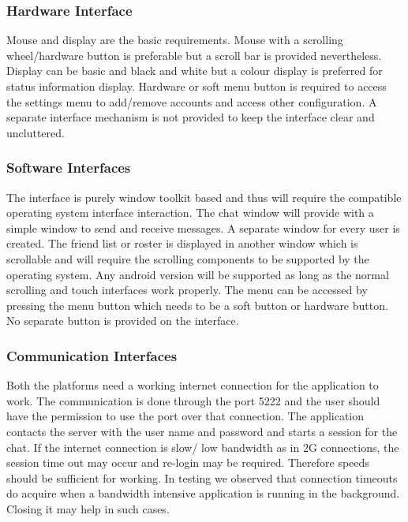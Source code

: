 \documentclass{SureshLimkar}
\begin{document}
\subsubsection{Hardware Interface}
\hspace{0.5 in}Mouse and display are the basic requirements. Mouse with a scrolling wheel/hardware button is preferable but a scroll bar is provided nevertheless. Display can be basic and black and white but a colour display is preferred for status information display.
\hspace{0.5 in}Hardware or soft menu button is required to access the settings menu to add/remove accounts and access other configuration. A separate interface mechanism is not provided to keep the  interface clear and uncluttered.
\subsubsection{Software Interfaces}
\hspace{0.5 in}The interface is purely window toolkit based and thus will require the compatible operating system interface interaction. The chat window will provide with a simple window to send and receive messages. A separate window for every user is created. The friend list or roster is displayed in another window which is scrollable and will require the scrolling components to be supported by the operating system.
\hspace{0.5 in}Any android version will be supported as long as the normal scrolling and touch interfaces work properly. The menu can be accessed by pressing the menu button which needs to be a soft button or hardware button. No separate button is provided on the interface. 
\subsubsection{Communication Interfaces}
\hspace{0.5 in}Both the platforms need a working internet connection for the application to work. The  communication is done through the port 5222 and the user should have the permission to use the port over that connection.
\hspace{0.5 in}The application contacts the server with the user name and password and starts a session for the chat. If the internet connection is slow/ low bandwidth as in 2G connections, the session time out may occur and re-login may be required. Therefore speeds should be sufficient for working. In testing we observed that connection timeouts do acquire when a bandwidth intensive application is running in the background. Closing it may help in such cases.
\end{document}
